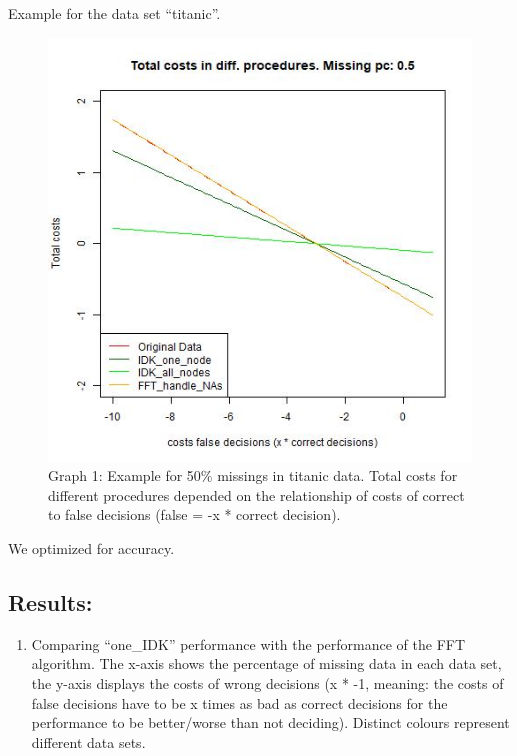 \documentclass[
]{article}
\providecommand{\tightlist}{%
  \setlength{\itemsep}{0pt}\setlength{\parskip}{0pt}}
\begin{document}
Example for the data set ``titanic''.

\begin{figure}
\centering
\includegraphics{graphs/diff_procedures_compare.jpg}
\caption{Graph 1: Example for 50\% missings in titanic data. Total costs
for different procedures depended on the relationship of costs of
correct to false decisions (false = -x * correct decision).}
\end{figure}

We optimized for accuracy.

\hypertarget{results}{%
\subsection{Results:}\label{results}}

\begin{enumerate}
\def\labelenumi{\arabic{enumi}.}
\tightlist
\item
  Comparing ``one\_IDK'' performance with the performance of the FFT
  algorithm. The x-axis shows the percentage of missing data in each
  data set, the y-axis displays the costs of wrong decisions (x * -1,
  meaning: the costs of false decisions have to be x times as bad as
  correct decisions for the performance to be better/worse than not
  deciding). Distinct colours represent different data sets.
\end{enumerate}
\end{document}
